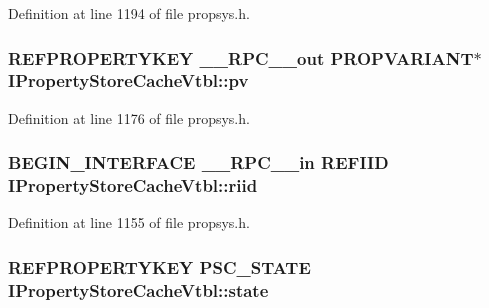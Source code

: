 Definition at line 1194 of file propsys.\+h.

\subsubsection[{\texorpdfstring{pv}{pv}}]{ {\bf R\+E\+F\+P\+R\+O\+P\+E\+R\+T\+Y\+K\+EY} {\bf \+\_\+\+\_\+\+R\+P\+C\+\_\+\+\_\+out} {\bf P\+R\+O\+P\+V\+A\+R\+I\+A\+NT}$\ast$ I\+Property\+Store\+Cache\+Vtbl\+::pv}\hypertarget{struct_i_property_store_cache_vtbl_a4e28dfadad1e0ac54548f8843a65378a}{}\label{struct_i_property_store_cache_vtbl_a4e28dfadad1e0ac54548f8843a65378a}


Definition at line 1176 of file propsys.\+h.

\subsubsection[{\texorpdfstring{riid}{riid}}]{\setlength{\rightskip}{0pt plus 5cm}B\+E\+G\+I\+N\+\_\+\+I\+N\+T\+E\+R\+F\+A\+CE {\bf \+\_\+\+\_\+\+R\+P\+C\+\_\+\+\_\+in} {\bf R\+E\+F\+I\+ID} I\+Property\+Store\+Cache\+Vtbl\+::riid}\hypertarget{struct_i_property_store_cache_vtbl_a55ca244645919429c42ae7997e00354f}{}\label{struct_i_property_store_cache_vtbl_a55ca244645919429c42ae7997e00354f}


Definition at line 1155 of file propsys.\+h.

\subsubsection[{\texorpdfstring{state}{state}}]{ {\bf R\+E\+F\+P\+R\+O\+P\+E\+R\+T\+Y\+K\+EY} {\bf P\+S\+C\+\_\+\+S\+T\+A\+TE} I\+Property\+Store\+Cache\+Vtbl\+::state}\hypertarget{struct_i_property_store_cache_vtbl_a109a71124dd2f8da717b1a86fac246b1}{}\label{struct_i_property_store_cache_vtbl_a109a71124dd2f8da717b1a86fac246b1}


